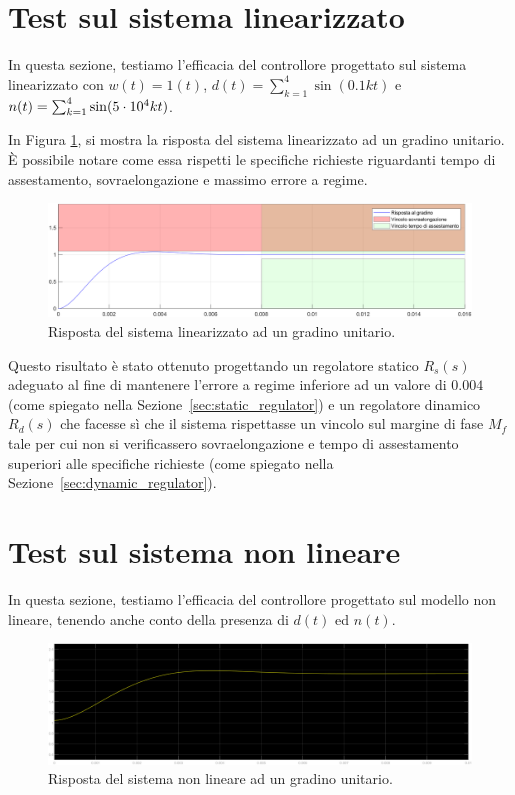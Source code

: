 \documentclass[a4paper, 11pt]{article}
\begin{document}
\section{Test sul sistema linearizzato}

In questa sezione, testiamo l'efficacia del controllore progettato sul sistema linearizzato con $w(t) = 1(t)$, $d(t)=\sum_{k = 1}^{4} \sin(0.1kt)$ e $n(t)=\sum_{k = 1}^{4} \sin(5\space\cdot\space 10^{4}kt) $.

In Figura \ref{fig:step_response}, si mostra la risposta del sistema linearizzato ad un gradino unitario. \`E possibile notare come essa rispetti le specifiche richieste riguardanti tempo di assestamento, sovraelongazione e massimo errore a regime.
 
\begin{figure}[h!]
	\centering
	\includegraphics[width=0.9\linewidth]{./images/stepRespLin.png}
	\caption{Risposta del sistema linearizzato ad un gradino unitario.}
	\label{fig:step_response}
\end{figure}

Questo risultato \`e stato ottenuto progettando un regolatore statico $R_s(s)$ adeguato al fine di mantenere l'errore a regime inferiore ad un valore di $0.004$ (come spiegato nella Sezione~\ref{sec:static_regulator}) 
e un regolatore dinamico $R_d(s)$ che facesse s\`i che il sistema rispettasse un vincolo sul margine di fase $M_f$ tale per cui non si verificassero sovraelongazione e tempo di assestamento superiori alle specifiche richieste
(come spiegato nella Sezione~\ref{sec:dynamic_regulator}).

\section{Test sul sistema non lineare}

In questa sezione, testiamo l'efficacia del controllore progettato sul modello non lineare, tenendo anche conto della presenza di $d(t)$ ed $n(t)$.

\begin{figure}[h!]
	\centering
	\includegraphics[width=0.9\linewidth]{./images/stepRespNonLinUni.png}
	\caption{Risposta del sistema non lineare ad un gradino unitario.}
	\label{fig:step_response_non_lin_uni}
\end{figure}
\end{document}
